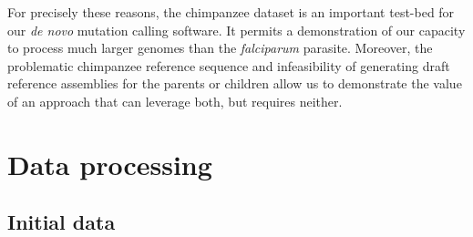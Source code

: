 For precisely these reasons, the chimpanzee dataset is an important test-bed for our \textit{de novo} mutation calling software.  It permits a demonstration of our capacity to process much larger genomes than the \textit{falciparum} parasite.  Moreover, the problematic chimpanzee reference sequence and infeasibility of generating draft reference assemblies for the parents or children allow us to demonstrate the value of an approach that can leverage both, but requires neither.

\section{Data processing}

\subsection{Initial data}

